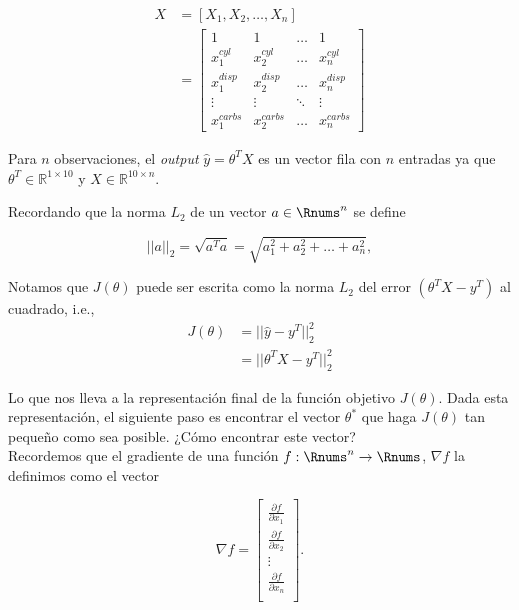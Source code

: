 \documentclass[11pt]{article}
\begin{document}
\begin{align}
	X &= [X_1, X_2, \ldots, X_n]\\
	 &= \begin{bmatrix}
	        1 & 1 & \ldots & 1 \\
	        x^{cyl}_1 & x^{cyl}_2 & \ldots & x^{cyl}_n\\
	        x^{disp}_1 & x^{disp}_2 & \ldots & x^{disp}_n\\
	        \vdots & \vdots & \ddots & \vdots\\
	        x^{carbs}_1 & x^{carbs}_2 & \ldots & x^{carbs}_n
	     \end{bmatrix} 
\end{align}

Para $n$ observaciones, el \textit{output} $\hat y = \theta^T X$ es un vector fila con $n$ entradas ya que $\theta^T \in \mathbb{R}^{1\times 10}$ y $X \in \mathbb{R}^{10 \times n}$.

Recordando que la norma $L_2$ de un vector $a\in\Rnums^n$ se define

\begin{equation}
  ||a||_2 = \sqrt{a^T a} = \sqrt{a_1^2 + a_2^2 + \ldots + a_n^2},
\end{equation}

Notamos que $J(\theta)$ puede ser escrita como la norma $L_2$ del error $(\theta^TX - y^T)$ al cuadrado, i.e., 
\begin{align}
	J(\theta) &= ||\hat y - y^T||_2^2 \\
	          &=   ||\theta^TX - y^T||_2^2
\end{align}

Lo que nos lleva a la representación final de la función objetivo $J(\theta)$. Dada esta representación, el siguiente paso es encontrar el vector $\theta^*$ que haga $J(\theta)$ tan pequeño como sea posible. ¿Cómo encontrar este vector?\\
 
Recordemos que el gradiente de una función $f:\Rnums^n\to\Rnums$, $\nabla f$ la definimos como el vector

\begin{equation}
  \nabla f = \begin{bmatrix}
            \frac{\partial f}{\partial x_1} \\
            \frac{\partial f}{\partial x_2} \\
            \vdots \\
            \frac{\partial f}{\partial x_n} \\
           \end{bmatrix}.
\end{equation}
\end{document}
